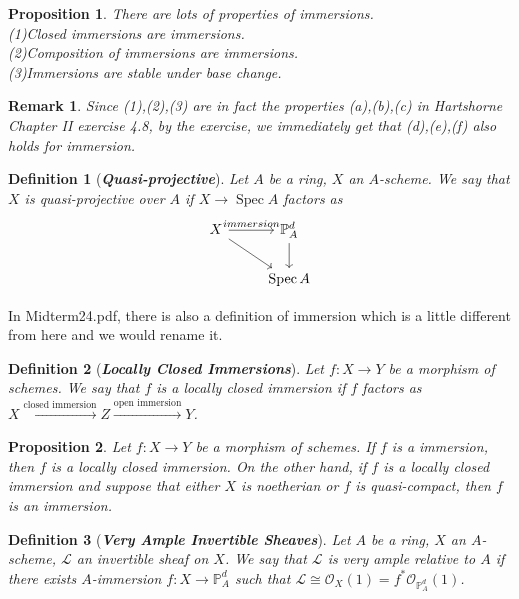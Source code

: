 \documentclass{ctexart}
\newtheorem{definition}{Definition}[section]
\newtheorem{remark}{Remark}[section]
\newtheorem{proposition}{Proposition}[section]
\newcommand{\spec}{\operatorname{Spec}}
\begin{document}
\begin{proposition}
    There are lots of properties of immersions. \\
    (1)Closed immersions are immersions. \\
    (2)Composition of immersions are immersions. \\
    (3)Immersions are stable under base change. 
    \label{Proposition 6.11}
\end{proposition}
\begin{remark}
    Since (1),(2),(3) are in fact the properties (a),(b),(c) in Hartshorne Chapter II exercise 4.8,
    by the exercise, we immediately get that (d),(e),(f) also holds for immersion.
\end{remark}
\begin{definition}[\textbf{\emph{Quasi-projective}}]
    Let $A$ be a ring, $X$ an $A$-scheme.
    We say that $X$ is quasi-projective over $A$ if $X \longrightarrow \spec A$ factors as 
    \begin{equation*}
        \begin{tikzcd}
            X \arrow[r, "immersion"] \arrow[dr] &
            \mathbb{P}_{A}^{d} \arrow[d] \\
            & \spec A
        \end{tikzcd}
    \end{equation*}
\end{definition}
In Midterm24.pdf, there is also a definition of immersion which is a little different from here and we would rename it.
\begin{definition}[\textbf{\emph{Locally Closed Immersions}}]
    Let $f: X \longrightarrow Y$ be a morphism of schemes.
    We say that $f$ is a locally closed immersion if $f$ factors as $X \overset{\text{closed immersion}}{\longrightarrow} Z \overset{\text{open immersion}}{\longrightarrow} Y$.
\end{definition}
\begin{proposition}
    Let $f: X \longrightarrow Y$ be a morphism of schemes.
    If $f$ is a immersion, then $f$ is a locally closed immersion.
    On the other hand, if $f$ is a locally closed immersion and suppose that either $X$ is noetherian or $f$ is quasi-compact, then $f$ is an immersion.
    \label{Proposition 6.12}
\end{proposition}
\begin{definition}[\textbf{\emph{Very Ample Invertible Sheaves}}]
    Let $A$ be a ring, $X$ an $A$-scheme, $\mathcal{L}$ an invertible sheaf on $X$.
    We say that $\mathcal{L}$ is very ample relative to $A$ if there exists $A$-immersion $f: X \longrightarrow \mathbb{P}_{A}^{d}$ such that $\mathcal{L} \cong \mathcal{O}_{X}(1) = f^{\ast}\mathcal{O}_{\mathbb{P}_{A}^{d}}(1)$.
\end{definition}
\end{document}
